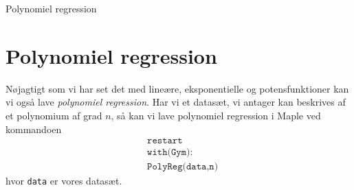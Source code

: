 \begin{center}
\Huge
Polynomiel regression
\end{center}
\section*{Polynomiel regression}

Nøjagtigt som vi har set det med lineære, eksponentielle og potensfunktioner kan vi også lave
\textit{polynomiel regression}. Har vi et datasæt, vi antager kan beskrives af et polynomium af grad $n$, så kan vi lave polynomiel regression i Maple ved kommandoen
\begin{align*}
	&\texttt{restart} \\
	&\texttt{with(Gym):} \\
	&\texttt{PolyReg(data,n)} 
\end{align*}
hvor \texttt{data} er vores datasæt. 
